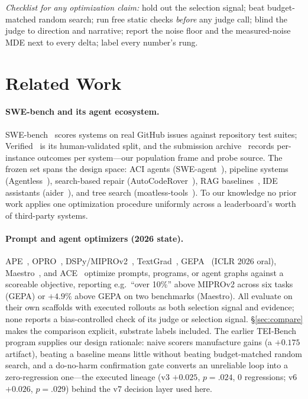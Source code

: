 \documentclass[11pt]{article}
\begin{document}
\noindent\emph{Checklist for any optimization claim:} hold out the selection
signal; beat budget-matched random search; run free static checks \emph{before}
any judge call; blind the judge to direction and narrative; report the noise
floor and the measured-noise MDE next to every delta; label every number's rung.

\section{Related Work}
\label{sec:related}
\paragraph{SWE-bench and its agent ecosystem.}
SWE-bench~\citep{swebench2024} scores systems on real GitHub issues against
repository test suites; Verified~\citep{swebenchverified2024} is its
human-validated split, and the submission archive~\citep{swebenchexperiments}
records per-instance outcomes per system---our population frame and probe
source. The frozen set spans the design space: ACI agents
(SWE-agent~\citep{sweagent2024}), pipeline systems
(Agentless~\citep{agentless2024}), search-based repair
(AutoCodeRover~\citep{autocoderover2024}), RAG baselines~\citep{swebench2024},
IDE assistants (aider~\citep{aider}), and tree search
(moatless-tools~\citep{moatless}). To our knowledge no prior work applies one
optimization procedure uniformly across a leaderboard's worth of third-party
systems.

\paragraph{Prompt and agent optimizers (2026 state).}
APE~\citep{ape2022}, OPRO~\citep{opro2023}, DSPy/MIPROv2~\citep{dspy2023,
mipro2024}, TextGrad~\citep{textgrad2024}, GEPA~\citep{gepa2025} (ICLR 2026
oral), Maestro~\citep{maestro2025}, and ACE~\citep{ace2026} optimize prompts,
programs, or agent graphs against a scoreable objective, reporting e.g.\
``over 10\%'' above MIPROv2 across six tasks (GEPA) or $+4.9\%$ above GEPA on
two benchmarks (Maestro). All evaluate on their own scaffolds with executed
rollouts as both selection signal and evidence; none reports a bias-controlled
check of its judge or selection signal. \S\ref{sec:compare} makes the
comparison explicit, substrate labels included. The earlier TEI-Bench program
supplies our design rationale: naive scorers manufacture gains (a $+0.175$
artifact), beating a baseline means little without beating budget-matched
random search, and a do-no-harm confirmation gate converts an unreliable loop
into a zero-regression one---the executed lineage (v3 $+0.025$, $p{=}.024$,
0 regressions; v6 $+0.026$, $p{=}.029$) behind the v7 decision layer used
here.
\end{document}
